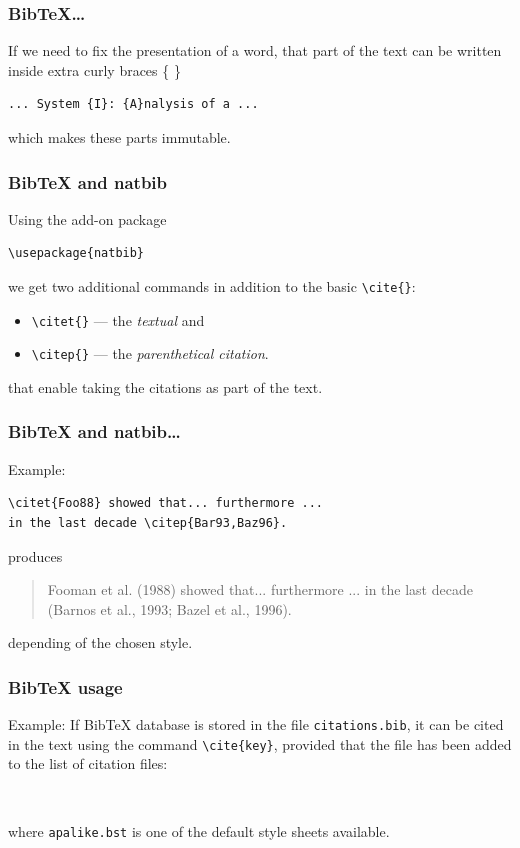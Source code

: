 \documentclass[13pt]{beamer}
\begin{document}
\begin{frame}[fragile]\frametitle{BibTeX\dots}
If we need to fix the presentation of a word, that part of the text can be
written inside extra curly braces \{ \}
\begin{verbatim}
... System {I}: {A}nalysis of a ...
\end{verbatim}
which makes these parts immutable.
\end{frame}


\begin{frame}[fragile]\frametitle{BibTeX and natbib}
Using the add-on package
\begin{verbatim}
\usepackage{natbib}
\end{verbatim}
we get two additional commands in addition to the basic \verb|\cite{}|:
\begin{itemize}
\item \verb|\citet{}| --- the \emph{textual} and
\item \verb|\citep{}| --- the \emph{parenthetical citation}.
\end{itemize}
that enable taking the citations as part of the text.
\end{frame}


\begin{frame}[fragile]\frametitle{BibTeX and natbib\dots}
Example:
\begin{verbatim}
\citet{Foo88} showed that... furthermore ...
in the last decade \citep{Bar93,Baz96}.
\end{verbatim}
produces
\begin{quotation}
\noindent
Fooman et al. (1988) showed that... furthermore ...
in the last decade (Barnos et al., 1993; Bazel et al., 1996).
\end{quotation}
depending of the chosen style.
\end{frame}



\begin{frame}[fragile]\frametitle{BibTeX usage}
Example: \medskip
If BibTeX database is stored in the file \texttt{citations.bib},
it can be cited in the text using the command \verb|\cite{key}|, provided that
the file has been added to the list of citation files:
\medskip
\begin{verbatim}


\end{verbatim}
where \texttt{apalike.bst} is one of the default style sheets available.
\end{frame}
\end{document}
